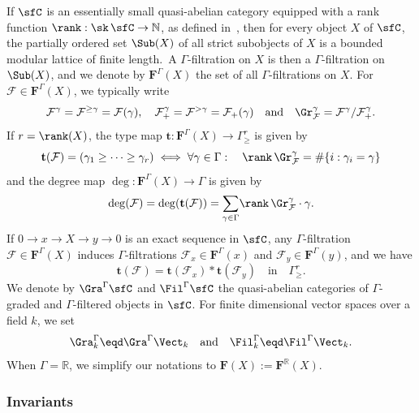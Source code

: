 If $\sfC$ is an essentially small quasi-abelian category equipped with a rank function $\rank:\sk\,\sfC\rightarrow\mathbb{N}$, as defined in~\cite[3.1]{Co16}, then for every object $X$ of $\sfC$, the partially ordered set $\Sub(X)$ of all strict subobjects of $X$ is a bounded modular lattice of finite length.~A $\Gamma$-filtration on $X$ is then a $\Gamma$-filtration on $\Sub(X)$, and we denote by $\mathbf{F}^{\Gamma}(X)$ the set of all $\Gamma$-filtrations on $X$. For $\mathcal{F}\in\mathbf{F}^{\Gamma}(X)$, we typically write
\[
\mathcal{F}^{\gamma}=\mathcal{F}^{\geq\gamma}=\mathcal{F}(\gamma),\quad\mathcal{F}_{+}^{\gamma}=\mathcal{F}^{>\gamma}=\mathcal{F}_{+}(\gamma)\quad\text{and}\quad\Gr_{\mathcal{F}}^{\gamma}=\mathcal{F}^{\gamma}/\mathcal{F}_{+}^{\gamma}.
\]
If $r=\rank(X)$, the type map $\mathbf{t}:\mathbf{F}^{\Gamma}(X)\rightarrow\Gamma_{\geq}^{r}$ is given by
\[
\mathbf{t}(\mathcal{F})=(\gamma_{1}\geq\dots\geq\gamma_{r})\iff{\forall\gamma\in\Gamma}:\quad\rank\,\Gr_{\mathcal{F}}^{\gamma}=\#\{i:\gamma_{i}=\gamma\}
\]
and the degree map $\deg:\mathbf{F}^{\Gamma}(X)\rightarrow\Gamma$ is given by
\[
\deg(\mathcal{F})=\deg(\mathbf{t}(\mathcal{F}))={\sum_{\gamma\in\Gamma}}\rank\,\Gr_{\mathcal{F}}^{\gamma}\cdot\gamma.
\]
If $0\rightarrow x\rightarrow X\rightarrow y\rightarrow0$ is an exact sequence in $\sfC$, any $\Gamma$-filtration $\mathcal{F}\in\mathbf{F}^{\Gamma}(X)$ induces $\Gamma$-filtrations $\mathcal{F}_{x}\in\mathbf{F}^{\Gamma}(x)$ and $\mathcal{F}_{y}\in\mathbf{F}^{\Gamma}(y)$, and we have
\[
\mathbf{t}(\mathcal{F})=\mathbf{t}(\mathcal{F}_{x})\ast\mathbf{t}(\mathcal{F}_{y})\quad\text{in}\quad\Gamma_{\geq}^{r}.
\]
We denote by $\Gra^{\Gamma}\sfC$ and $\Fil^{\Gamma}\sfC$ the quasi-abelian categories of $\Gamma$-graded and $\Gamma$-filtered objects in $\sfC$. For finite dimensional vector spaces over a field $k$, we set
\[
\Gra_{k}^{\Gamma}\eqd\Gra^{\Gamma}\Vect_{k}\quad\text{and}\quad\Fil_{k}^{\Gamma}\eqd\Fil^{\Gamma}\Vect_{k}.
\]
When $\Gamma=\mathbb{R}$, we simplify our notations to $\mathbf{F}(X):=\mathbf{F}^{\mathbb{R}}(X)$.

\subsubsection{Invariants}\label{subsec:Invariants}

